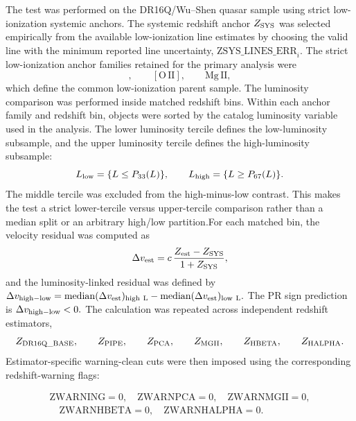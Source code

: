 \documentclass[11pt]{article}
\begin{document}
The test was performed on the DR16Q/Wu--Shen \cite{Wu2020, Ahumada2020} quasar sample using strict
low-ionization systemic anchors. The systemic redshift anchor \(Z_{\rm SYS}\)
was selected empirically from the available low-ionization line estimates by
choosing the valid line with the minimum reported line uncertainty,
\(\mathrm{ZSYS\_LINES\_ERR}_i\). The strict low-ionization anchor families
retained for the primary analysis were
\begin{equation}
[\mathrm{O\,III}],
\qquad
[\mathrm{O\,II}],
\qquad
\mathrm{Mg\,II},
\end{equation}
which define the common low-ionization parent sample. The luminosity comparison was performed inside matched redshift bins. Within each anchor family and redshift bin, objects were sorted by the catalog
luminosity variable used in the analysis. The lower luminosity tercile defines
the low-luminosity subsample, and the upper luminosity tercile defines the
high-luminosity subsample:
\begin{equation}
L_{\rm low}
=
\{L\leq P_{33}(L)\},
\qquad
L_{\rm high}
=
\{L\geq P_{67}(L)\}.
\end{equation}
The middle tercile was excluded from the high-minus-low contrast. This makes the test a strict lower-tercile versus upper-tercile comparison rather than a median split or an arbitrary high/low partition.For each matched bin, the velocity residual was computed as
\begin{equation}
\Delta v_{\rm est}
=
c\,
\frac{
Z_{\rm est}-Z_{\rm SYS}
}{
1+Z_{\rm SYS}
},
\end{equation}
and the luminosity-linked residual was defined by $\Delta v_{\rm high-low} = {\rm median}(\Delta v_{\rm est})_{\rm high\ L} - {\rm median}(\Delta v_{\rm est})_{\rm low\ L}.$ The PR sign prediction is $\Delta v_{\rm high-low}<0.$ The calculation was repeated across independent redshift estimators,
\begin{equation}
Z_{\rm DR16Q\_BASE},
\qquad
Z_{\rm PIPE},
\qquad
Z_{\rm PCA},
\qquad
Z_{\rm MGII},
\qquad
Z_{\rm HBETA},
\qquad
Z_{\rm HALPHA}.
\end{equation}
Estimator-specific warning-clean cuts were then imposed using the corresponding
redshift-warning flags:

\begin{equation}
\begin{gathered}
  \mathrm{ZWARNING}=0, \quad \mathrm{ZWARNPCA}=0, \quad \mathrm{ZWARNMGII}=0, \\
  \quad \mathrm{ZWARNHBETA}=0, \quad \mathrm{ZWARNHALPHA}=0. \quad
\end{gathered}
\end{equation}
\end{document}
